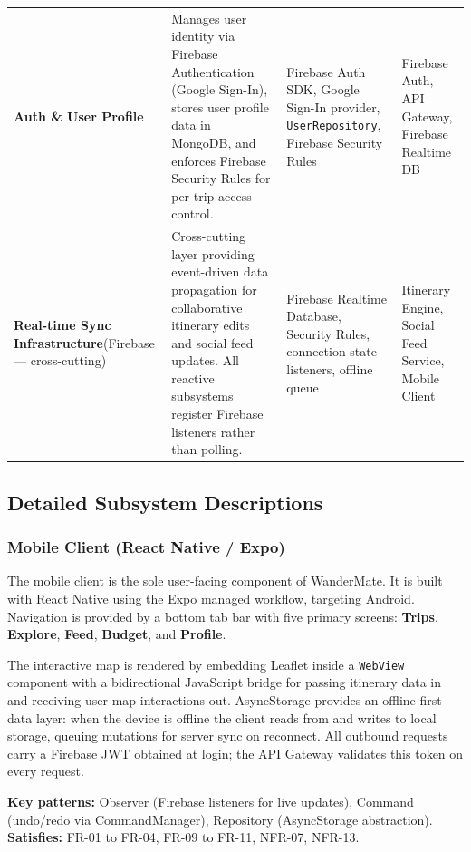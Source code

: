 \documentclass[12pt, a4paper]{article}
\begin{document}
\begin{longtable}{L{3.0cm} L{4.8cm} L{3.8cm} L{2.2cm}}
\textbf{Auth \& User Profile} &
Manages user identity via Firebase Authentication (Google Sign-In), stores user profile data in MongoDB, and enforces Firebase Security Rules for per-trip access control. &
Firebase Auth SDK, Google Sign-In provider, \texttt{UserRepository}, Firebase Security Rules &
Firebase Auth, API Gateway, Firebase Realtime DB \\

\textbf{Real-time Sync Infrastructure}\newline(Firebase --- cross-cutting) &
Cross-cutting layer providing event-driven data propagation for collaborative itinerary edits and social feed updates. All reactive subsystems register Firebase listeners rather than polling. &
Firebase Realtime Database, Security Rules, connection-state listeners, offline queue &
Itinerary Engine, Social Feed Service, Mobile Client \\

\end{longtable}

\subsection{Detailed Subsystem Descriptions}

\subsubsection{Mobile Client (React Native / Expo)}

The mobile client is the sole user-facing component of WanderMate. It is built with React Native using the Expo managed workflow, targeting Android. Navigation is provided by a bottom tab bar with five primary screens: \textbf{Trips}, \textbf{Explore}, \textbf{Feed}, \textbf{Budget}, and \textbf{Profile}.

The interactive map is rendered by embedding Leaflet inside a \texttt{WebView} component with a bidirectional JavaScript bridge for passing itinerary data in and receiving user map interactions out. AsyncStorage provides an offline-first data layer: when the device is offline the client reads from and writes to local storage, queuing mutations for server sync on reconnect. All outbound requests carry a Firebase JWT obtained at login; the API Gateway validates this token on every request.

\begin{tcolorbox}[notebox]
  \textbf{Key patterns:} Observer (Firebase listeners for live updates), Command (undo/redo via CommandManager), Repository (AsyncStorage abstraction).\\[2pt]
  \textbf{Satisfies:} FR-01 to FR-04, FR-09 to FR-11, NFR-07, NFR-13.
\end{tcolorbox}
\end{document}
